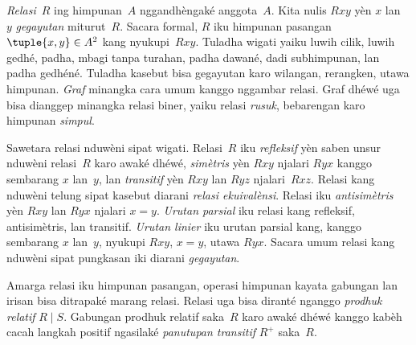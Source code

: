 \emph{Relasi}~$R$ ing himpunan~$A$ nggandhèngaké anggota~$A$.
Kita nulis $Rxy$ yèn $x$ lan~$y$ \emph{gegayutan} miturut~$R$.
Sacara formal, $R$ iku himpunan pasangan $\tuple{x,y}\in A^2$
kang nyukupi~$Rxy$. Tuladha wigati yaiku luwih cilik, luwih gedhé,
padha, mbagi tanpa turahan, padha dawané, dadi subhimpunan, lan
padha gedhéné. Tuladha kasebut bisa gegayutan karo wilangan,
rerangken, utawa himpunan. \emph{Graf} minangka cara umum kanggo
nggambar relasi. Graf dhéwé uga bisa dianggep minangka relasi
biner, yaiku relasi \emph{rusuk}, bebarengan karo himpunan \emph{simpul}.

Sawetara relasi nduwèni sipat wigati. Relasi~$R$ iku \emph{refleksif}
yèn saben unsur nduwèni relasi~$R$ karo awaké dhéwé, \emph{simètris}
yèn $Rxy$ njalari $Ryx$ kanggo sembarang $x$ lan~$y$, lan
\emph{transitif} yèn $Rxy$ lan $Ryz$ njalari~$Rxz$. Relasi kang
nduwèni telung sipat kasebut diarani \emph{relasi ekuivalènsi}.
Relasi iku \emph{antisimètris} yèn $Rxy$ lan $Ryx$ njalari $x=y$.
\emph{Urutan parsial} iku relasi kang refleksif, antisimètris, lan
transitif. \emph{Urutan linier} iku urutan parsial kang, kanggo
sembarang $x$ lan~$y$, nyukupi $Rxy$, $x=y$, utawa $Ryx$.
Sacara umum relasi kang nduwèni sipat pungkasan iki diarani
\emph{gegayutan}.

Amarga relasi iku himpunan pasangan, operasi himpunan kayata
gabungan lan irisan bisa ditrapaké marang relasi. Relasi uga
bisa diranté nganggo \emph{prodhuk relatif} $R\mid S$.
Gabungan prodhuk relatif saka~$R$ karo awaké dhéwé kanggo
kabèh cacah langkah positif ngasilaké \emph{panutupan transitif}
$R^+$ saka~$R$.
